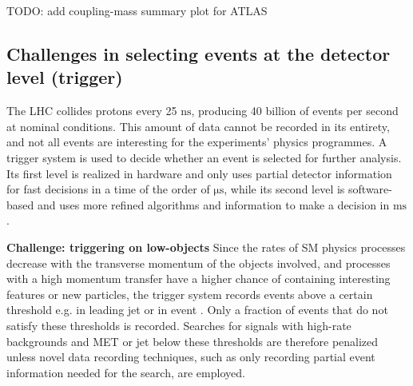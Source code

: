 TODO: add coupling-mass summary plot for ATLAS

\begin{textbox}[!h]
\section{Challenges in selecting events at the detector level (trigger)}
The LHC collides protons every 25 $\mathrm{ns}$, producing 40 billion 
of events per second at nominal conditions. This amount of data cannot be 
recorded in its entirety, and not all events are interesting
for the experiments' physics programmes. %
A trigger system is used to decide whether an event is selected for further analysis. 
Its first level is realized in hardware and only uses
partial detector information for fast decisions in a time of
the order of $\mathrm{\mu s}$, while its second level is software-based
and uses more refined algorithms and information to make a
decision in $\mathrm{ms}$. 

\textbf{Challenge: triggering on low-\pt objects}
Since the rates of SM physics processes decrease
with the transverse momentum of the objects involved, and processes
with a high momentum transfer have a higher chance of containing
interesting features or new particles, the trigger system records
events above a certain threshold e.g. in leading jet \pt or in event \MET. 
Only a fraction of events that do not satisfy these thresholds is recorded. 
Searches for signals with high-rate backgrounds and 
MET or jet \pt below these thresholds are 
therefore penalized unless novel
data recording techniques, such as only recording partial event information 
needed for the search, are employed.


\end{textbox}
